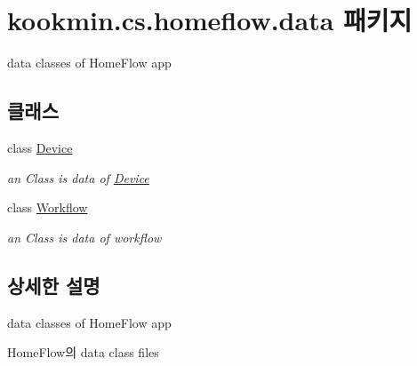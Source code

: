 \hypertarget{namespacekookmin_1_1cs_1_1homeflow_1_1data}{}\section{kookmin.\+cs.\+homeflow.\+data 패키지}
\label{namespacekookmin_1_1cs_1_1homeflow_1_1data}


data classes of Home\+Flow app  


\subsection*{클래스}
\begin{DoxyCompactItemize}
\item 
class \hyperlink{classkookmin_1_1cs_1_1homeflow_1_1data_1_1_device}{Device}
\begin{DoxyCompactList}\small\item\em an Class is data of \hyperlink{classkookmin_1_1cs_1_1homeflow_1_1data_1_1_device}{Device} \end{DoxyCompactList}\item 
class \hyperlink{classkookmin_1_1cs_1_1homeflow_1_1data_1_1_workflow}{Workflow}
\begin{DoxyCompactList}\small\item\em an Class is data of workflow \end{DoxyCompactList}\end{DoxyCompactItemize}


\subsection{상세한 설명}
data classes of Home\+Flow app 

Home\+Flow의 data class files 